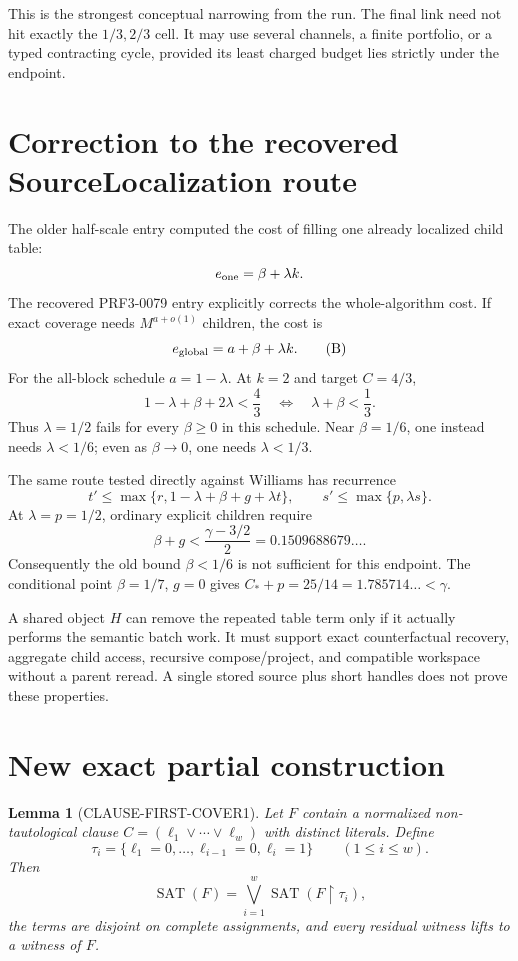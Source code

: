 \documentclass[11pt]{article}
\newtheorem{lemma}[theorem]{Lemma}
\newcommand{\SAT}{\operatorname{SAT}}
\begin{document}
This is the strongest conceptual narrowing from the run.  The final link
need not hit exactly the $1/3,2/3$ cell.  It may use several channels, a
finite portfolio, or a typed contracting cycle, provided its least charged
budget lies strictly under the endpoint.

\section{Correction to the recovered SourceLocalization route}

The older half-scale entry computed the cost of filling one already localized
child table:
\[
 e_{\rm one}=\beta+\lambda k.
\]
The recovered PRF3-0079 entry explicitly corrects the whole-algorithm cost.
If exact coverage needs $M^{a+o(1)}$ children, the cost is
\begin{equation*}
 e_{\rm global}=a+\beta+\lambda k.
 \tag{B}
\end{equation*}
For the all-block schedule $a=1-\lambda$.  At $k=2$ and target $C=4/3$,
\[
 1-\lambda+\beta+2\lambda<\frac43
 \quad\Longleftrightarrow\quad
 \boxed{\lambda+\beta<\frac13.}
\]
Thus $\lambda=1/2$ fails for every $\beta\ge0$ in this schedule.  Near
$\beta=1/6$, one instead needs $\lambda<1/6$; even as $\beta\to0$, one needs
$\lambda<1/3$.

The same route tested directly against Williams has recurrence
\[
 t'\le\max\{r,1-\lambda+\beta+g+\lambda t\},
 \qquad s'\le\max\{p,\lambda s\}.
\]
At $\lambda=p=1/2$, ordinary explicit children require
\begin{equation*}
 \boxed{\beta+g<\frac{\gamma-3/2}{2}
 =0.1509688679\ldots.}
 \tag{C}
\end{equation*}
Consequently the old bound $\beta<1/6$ is not sufficient for this endpoint.
The conditional point $\beta=1/7$, $g=0$ gives
$C_*+p=25/14=1.785714\ldots<\gamma$.

A shared object $H$ can remove the repeated table term only if it actually
performs the semantic batch work.  It must support exact counterfactual
recovery, aggregate child access, recursive compose/project, and compatible
workspace without a parent reread.  A single stored source plus short handles
does not prove these properties.

\section{New exact partial construction}

\begin{lemma}[CLAUSE-FIRST-COVER1]
Let $F$ contain a normalized non-tautological clause
$C=(\ell_1\vee\cdots\vee\ell_w)$ with distinct literals.  Define
\[
 \tau_i=\{\ell_1=0,\ldots,\ell_{i-1}=0,\ell_i=1\}
 \qquad(1\le i\le w).
\]
Then
\[
 \SAT(F)=\bigvee_{i=1}^{w}\SAT(F\upharpoonright\tau_i),
\]
the terms are disjoint on complete assignments, and every residual witness
lifts to a witness of $F$.
\end{lemma}
\end{document}
